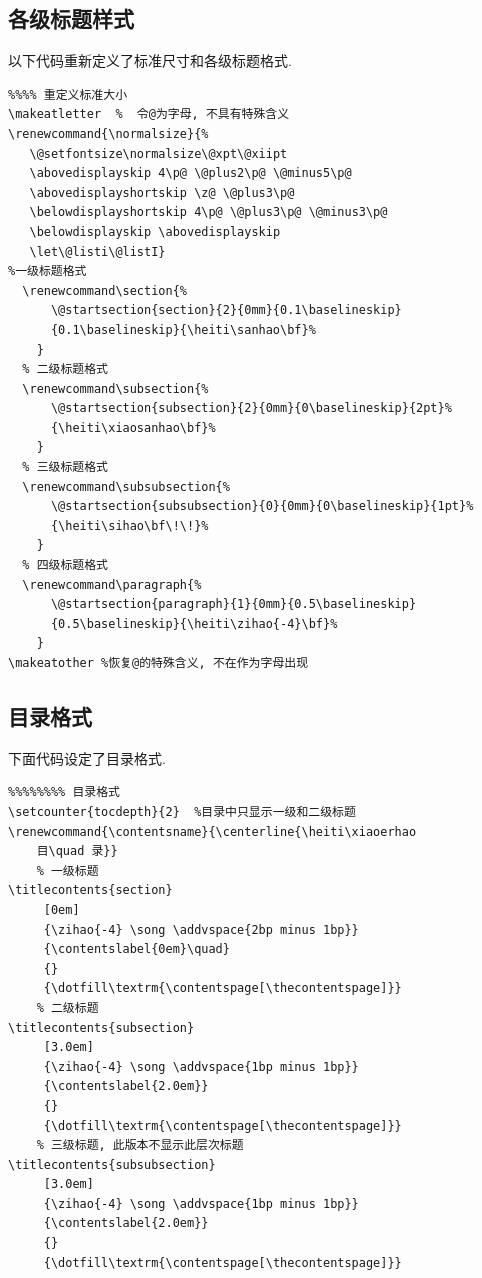 \documentclass[a4paper,12pt,twoside]{ctexart}
\begin{document}
    \subsection{各级标题样式}
以下代码重新定义了标准尺寸和各级标题格式.\vspace*{-10pt}
    \begin{verbatim}
%%%% 重定义标准大小
\makeatletter  %  令@为字母, 不具有特殊含义
\renewcommand{\normalsize}{%
   \@setfontsize\normalsize\@xpt\@xiipt
   \abovedisplayskip 4\p@ \@plus2\p@ \@minus5\p@
   \abovedisplayshortskip \z@ \@plus3\p@
   \belowdisplayshortskip 4\p@ \@plus3\p@ \@minus3\p@
   \belowdisplayskip \abovedisplayskip
   \let\@listi\@listI}
%一级标题格式
  \renewcommand\section{%
      \@startsection{section}{2}{0mm}{0.1\baselineskip}
      {0.1\baselineskip}{\heiti\sanhao\bf}%
    }
  % 二级标题格式
  \renewcommand\subsection{%
      \@startsection{subsection}{2}{0mm}{0\baselineskip}{2pt}%
      {\heiti\xiaosanhao\bf}%
    }
  % 三级标题格式
  \renewcommand\subsubsection{%
      \@startsection{subsubsection}{0}{0mm}{0\baselineskip}{1pt}%
      {\heiti\sihao\bf\!\!}%
    }
  % 四级标题格式
  \renewcommand\paragraph{%
      \@startsection{paragraph}{1}{0mm}{0.5\baselineskip}
      {0.5\baselineskip}{\heiti\zihao{-4}\bf}%
    }
\makeatother %恢复@的特殊含义, 不在作为字母出现
    \end{verbatim}\vspace*{0pt}

\vspace*{-30pt}
    \subsection{目录格式}
下面代码设定了目录格式.
    \begin{verbatim}
%%%%%%%% 目录格式
\setcounter{tocdepth}{2}  %目录中只显示一级和二级标题
\renewcommand{\contentsname}{\centerline{\heiti\xiaoerhao
    目\quad 录}}
    % 一级标题
\titlecontents{section}
     [0em]
     {\zihao{-4} \song \addvspace{2bp minus 1bp}}
     {\contentslabel{0em}\quad}
     {}
     {\dotfill\textrm{\contentspage[\thecontentspage]}}
    % 二级标题
\titlecontents{subsection}
     [3.0em]
     {\zihao{-4} \song \addvspace{1bp minus 1bp}}
     {\contentslabel{2.0em}}
     {}
     {\dotfill\textrm{\contentspage[\thecontentspage]}}
    % 三级标题, 此版本不显示此层次标题
\titlecontents{subsubsection}
     [3.0em]
     {\zihao{-4} \song \addvspace{1bp minus 1bp}}
     {\contentslabel{2.0em}}
     {}
     {\dotfill\textrm{\contentspage[\thecontentspage]}}
    \end{verbatim}  \vspace*{0pt}
\end{document}
